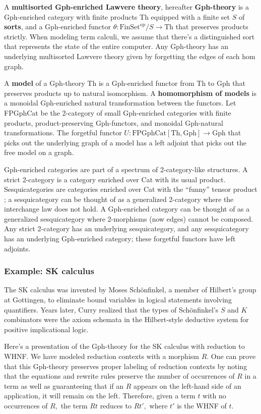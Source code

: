 \documentclass[a4paper,UKenglish]{article}
\newcommand{\maps}{\colon}
\newcommand{\Th}{\mathrm{Th}}
\newcommand{\Gph}{\mathrm{Gph}}
\newcommand{\FinSet}{\mathrm{FinSet}}
\newcommand{\FPGphCat}{\mathrm{FPGphCat}}
\newcommand{\op}{\mathrm{op}}
\begin{document}
A {\bf multisorted Gph-enriched Lawvere theory}, hereafter {\bf Gph-theory} is a Gph-enriched category with finite products Th equipped with a finite set $S$ of {\bf sorts}, and a Gph-enriched functor $\theta\maps \FinSet^{\op}/S \to \Th$ that preserves products strictly.  When modeling term calculi, we assume that there's a distinguished sort that represents the state of the entire computer.  Any Gph-theory has an underlying multisorted Lawvere theory given by forgetting the edges of each hom graph.

A {\bf model} of a Gph-theory Th is a Gph-enriched functor from Th to Gph that preserves products up to natural isomorphism.  A {\bf homomorphism of models} is a monoidal Gph-enriched natural transformation between the functors.  Let FPGphCat be the 2-category of small Gph-enriched categories with finite products, product-preserving Gph-functors, and monoidal Gph-natural transformations.  The forgetful functor $U\maps \FPGphCat[\Th, \Gph] \to \Gph$ that picks out the underlying graph of a model has a left adjoint that picks out the free model on a graph.

Gph-enriched categories are part of a spectrum of 2-category-like structures.  A strict 2-category is a category enriched over Cat with its usual product.  Sesquicategories are categories enriched over Cat with the ``funny'' tensor product \cite{Lack2010}; a sesquicategory can be thought of as a generalized 2-category where the interchange law does not hold.  A Gph-enriched category can be thought of as a generalized sesquicategory where 2-morphisms (now edges) cannot be composed.  Any strict 2-category has an underlying sesquicategory, and any sesquicategory has an underlying Gph-enriched category; these forgetful functors have left adjoints.

\subsubsection{Example: SK calculus}
\label{skexample}
The SK calculus was invented by Moses Sch\"onfinkel, a member of Hilbert's group at Gottingen, to eliminate bound variables in logical statements involving quantifiers.  Years later, Curry realized that the types of Sch\"onfinkel's $S$ and $K$ combinators were the axiom schemata in the Hilbert-style deductive system for positive implicational logic.

Here's a presentation of the Gph-theory for the SK calculus with reduction to WHNF.  We have modeled reduction contexts with a morphism $R.$  One can prove that this Gph-theory preserves proper labeling of reduction contexts by noting that the equations and rewrite rules preserve the number of occurrences of $R$ in a term as well as guaranteeing that if an $R$ appears on the left-hand side of an application, it will remain on the left.  Therefore, given a term $t$ with no occurrences of $R,$ the term $Rt$ reduces to $Rt',$ where $t'$ is the WHNF of $t.$
\end{document}
